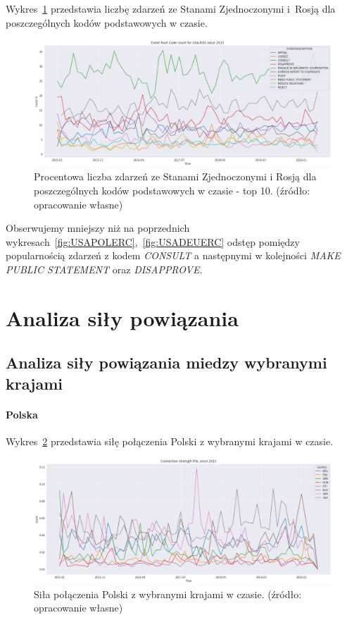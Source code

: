\documentclass[11pt]{report}
\begin{document}
    Wykres~\ref{fig:USARUSERC} przedstawia liczbę zdarzeń ze Stanami Zjednoczonymi i~Rosją dla poszczególnych kodów podstawowych w czasie.
    \begin{figure}[!htp]
        \centering
        \includegraphics[width=\linewidth]{fig/USA/USARUSERCperc.png}
        \caption{Procentowa liczba zdarzeń ze Stanami Zjednoczonymi i Rosją dla poszczególnych kodów podstawowych w czasie - top 10. (źródło: opracowanie własne)}
        \label{fig:USARUSERC}
    \end{figure}
    Obserwujemy mniejszy niż na poprzednich wykresach~\ref{fig:USAPOLERC},~\ref{fig:USADEUERC} odstęp pomiędzy popularnością zdarzeń z kodem \textit{CONSULT} a następnymi w kolejności \textit{MAKE PUBLIC STATEMENT} oraz \textit{DISAPPROVE}.


    \section{Analiza siły powiązania}\label{sec:analiza-siły-powiązania}

    \subsection{Analiza siły powiązania miedzy wybranymi krajami}

    \paragraph{Polska}

    Wykres~\ref{fig:PLConnection} przedstawia siłę połączenia Polski z wybranymi krajami w czasie.


    \begin{figure}[!htp]
        \centering
        \includegraphics[width=\linewidth]{fig/PL/POLConnection.png}
        \caption{Siła połączenia Polski z wybranymi krajami w czasie. (źródło: opracowanie własne)}
        \label{fig:PLConnection}
    \end{figure}
\end{document}

